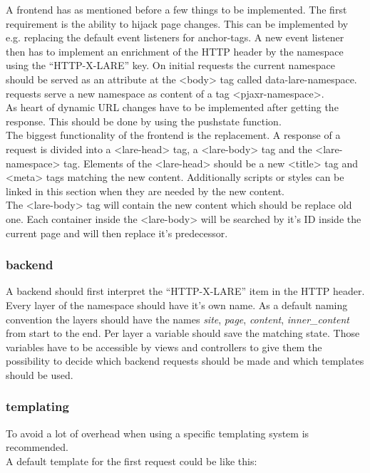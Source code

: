 A \lare{} frontend has as mentioned before a few things to be implemented.
The first requirement is the ability to hijack page changes.
This can be implemented by e.g. replacing the default event listeners for anchor-tags.
A new event listener then has to implement an enrichment of the HTTP header by the namespace using the \enquote{HTTP-X-LARE} key.
On initial requests the current namespace should be served as an attribute at the <body> tag called data-lare-namespace.
\lare{} requests serve a new namespace as content of a tag <pjaxr-namespace>.
\\
As heart of \lare{} dynamic URL changes have to be implemented after getting the response.
This should be done by using the pushstate function.
\\
The biggest functionality of the \lare{} frontend is the replacement.
A response of a \lare{} request is divided into a <lare-head> tag, a <lare-body> tag and the <lare-namespace> tag.
Elements of the <lare-head> should be a new <title> tag and <meta> tags matching the new content. 
Additionally scripts or styles can be linked in this section when they are needed by the new content.
\\
The <lare-body> tag will contain the new content which should be replace old one.
Each container inside the <lare-body> will be searched by it's ID inside the current page and will then replace it's predecessor.

\subsubsection{\lare{} backend}

A \lare{} backend should first interpret the \enquote{HTTP-X-LARE} item in the HTTP header.
Every layer of the namespace should have it's own name.
As a default naming convention the layers should have the names \emph{site}, \emph{page}, \emph{content}, \emph{inner\_content} from start to the end.
Per layer a variable should save the matching state.
Those variables have to be accessible by views and controllers to give them the possibility to decide which backend requests should be made and which templates should be used.

\subsubsection{\lare{} templating}

To avoid a lot of overhead when using \lare{} a specific templating system is recommended.
\\
A default template for the first request could be like this:

